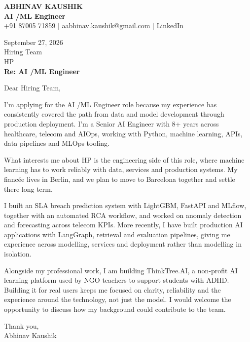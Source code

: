 \documentclass[10pt,a4paper]{article}
\begin{document}
\begin{center}
{\Large\bfseries ABHINAV KAUSHIK}\\[2pt]
{\bfseries AI /ML Engineer}\\[2pt]
+91 87005 71859 \quad | \quad aabhinav.kaushik@gmail.com \quad | \quad LinkedIn
\end{center}
\vspace{8pt}
September 27, 2026\\[6pt]
Hiring Team\\
HP\\[4pt]
\textbf{Re: AI /ML Engineer}

Dear Hiring Team,

I’m applying for the AI /ML Engineer role because my experience has consistently covered the path from data and model development through production deployment. I’m a Senior AI Engineer with 8+ years across healthcare, telecom and AIOps, working with Python, machine learning, APIs, data pipelines and MLOps tooling.

What interests me about HP is the engineering side of this role, where machine learning has to work reliably with data, services and production systems. My fiancée lives in Berlin, and we plan to move to Barcelona together and settle there long term.

I built an SLA breach prediction system with LightGBM, FastAPI and MLflow, together with an automated RCA workflow, and worked on anomaly detection and forecasting across telecom KPIs. More recently, I have built production AI applications with LangGraph, retrieval and evaluation pipelines, giving me experience across modelling, services and deployment rather than modelling in isolation.

Alongside my professional work, I am building ThinkTree.AI, a non-profit AI learning platform used by NGO teachers to support students with ADHD. Building it for real users keeps me focused on clarity, reliability and the experience around the technology, not just the model. I would welcome the opportunity to discuss how my background could contribute to the team.

Thank you,\\
Abhinav Kaushik
\end{document}
